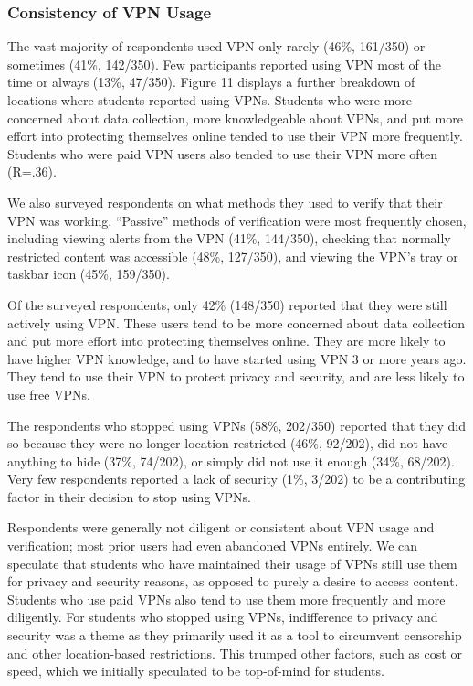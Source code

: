\subsubsection{Consistency of VPN Usage}

The vast majority of respondents used VPN only rarely (46\%, 161/350) or
sometimes (41\%, 142/350). Few participants reported using VPN most of the
time or always (13\%, 47/350). Figure 11 displays a further breakdown of
locations where students reported using VPNs. Students who were more concerned
about data collection, more knowledgeable about VPNs, and put more effort into
protecting themselves online tended to use their VPN more frequently. Students
who were paid VPN users also tended to use their VPN more often (R=.36).

We also surveyed respondents on what methods they used to verify that their
VPN was working. “Passive” methods of verification were most frequently
chosen, including viewing alerts from the VPN (41\%, 144/350), checking that
normally restricted content was accessible (48\%, 127/350), and viewing the
VPN’s tray or taskbar icon (45\%, 159/350).

Of the surveyed respondents, only 42\% (148/350) reported that they were still
actively using VPN. These users tend to be more concerned about data
collection and put more effort into protecting themselves online. They are
more likely to have higher VPN knowledge, and to have started using VPN 3 or
more years ago. They tend to use their VPN to protect privacy and security,
and are less likely to use free VPNs.

The respondents who stopped using VPNs (58\%, 202/350) reported that they did
so because they were no longer location restricted (46\%, 92/202), did not
have anything to hide (37\%, 74/202), or simply did not use it enough (34\%,
68/202). Very few respondents reported a lack of security (1\%, 3/202) to be a
contributing factor in their decision to stop using VPNs.

Respondents were generally not diligent or consistent about VPN usage and
verification; most prior users had even abandoned VPNs entirely. We can
speculate that students who have maintained their usage of VPNs still use them
for privacy and security reasons, as opposed to purely a desire to access
content. Students who use paid VPNs also tend to use them more frequently and
more diligently. For students who stopped using VPNs, indifference to privacy
and security was a theme as they primarily used it as a tool to circumvent
censorship and other location-based restrictions. This trumped other factors,
such as cost or speed, which we initially speculated to be top-of-mind for
students.

